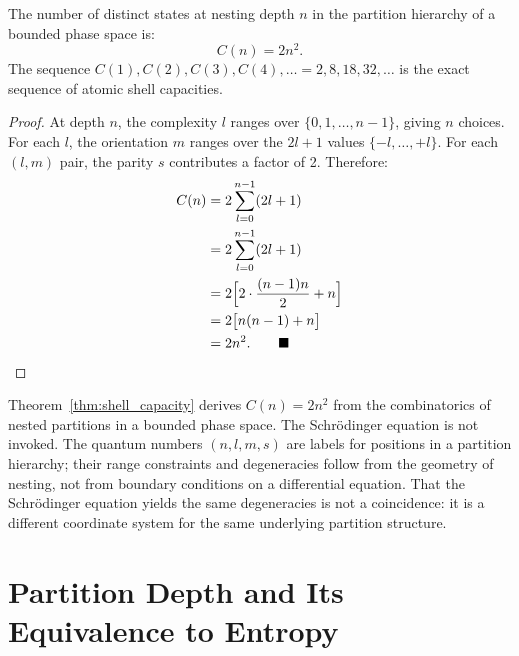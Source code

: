\begin{theorem}
\label{thm:shell_capacity}
The number of distinct states at nesting depth $n$ in the partition hierarchy
of a bounded phase space is:
\begin{equation}
  C(n) = 2n^2.
\end{equation}
The sequence $C(1), C(2), C(3), C(4), \ldots = 2, 8, 18, 32, \ldots$ is
the exact sequence of atomic shell capacities.
\end{theorem}

\begin{proof}
At depth $n$, the complexity $l$ ranges over $\{0, 1, \ldots, n-1\}$,
giving $n$ choices. For each $l$, the orientation $m$ ranges over the
$2l+1$ values $\{-l, \ldots, +l\}$. For each $(l, m)$ pair, the parity
$s$ contributes a factor of 2. Therefore:
\begin{align}
  C(n) &= 2 \sum_{l=0}^{n-1} (2l+1) \notag \\
       &= 2 \sum_{l=0}^{n-1} (2l+1) \notag \\
       &= 2 \Bigl[ 2\cdot\frac{(n-1)n}{2} + n \Bigr] \notag \\
       &= 2 \bigl[ n(n-1) + n \bigr] \notag \\
       &= 2n^2. \qquad\blacksquare
\end{align}
\end{proof}

\begin{remark}
Theorem~\ref{thm:shell_capacity} derives $C(n) = 2n^2$ from the combinatorics
of nested partitions in a bounded phase space. The Schr\"{o}dinger equation
is not invoked. The quantum numbers $(n, l, m, s)$ are labels for positions
in a partition hierarchy; their range constraints and degeneracies follow from
the geometry of nesting, not from boundary conditions on a differential equation.
That the Schr\"{o}dinger equation yields the same degeneracies is not a
coincidence: it is a different coordinate system for the same underlying
partition structure.
\end{remark}

\section{Partition Depth and Its Equivalence to Entropy}
\label{sec:partition_depth}

